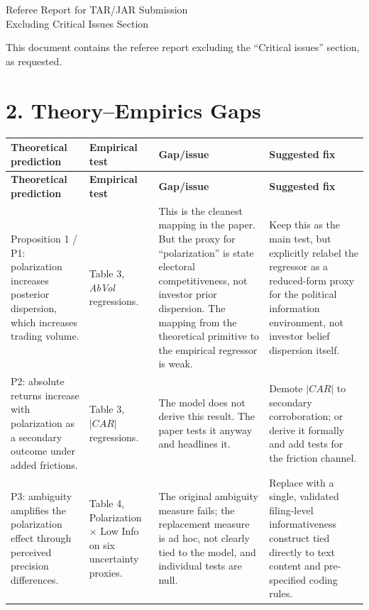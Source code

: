\documentclass[11pt]{article}
\begin{document}
\begin{center}
{\LARGE Referee Report for TAR/JAR Submission}\\[0.5em]
{\large Excluding Critical Issues Section}
\end{center}

This document contains the referee report excluding the ``Critical issues'' section, as requested.

\section*{2. Theory--Empirics Gaps}

\renewcommand{\arraystretch}{1.25}
\small
\begin{longtable}{>{\RaggedRight\arraybackslash}p{} >{\RaggedRight\arraybackslash}p{} >{\RaggedRight\arraybackslash}p{} >{\RaggedRight\arraybackslash}p{}}
\toprule
\textbf{Theoretical prediction} & \textbf{Empirical test} & \textbf{Gap/issue} & \textbf{Suggested fix} \\
\midrule
\endfirsthead
\toprule
\textbf{Theoretical prediction} & \textbf{Empirical test} & \textbf{Gap/issue} & \textbf{Suggested fix} \\
\midrule
\endhead

Proposition 1 / P1: polarization increases posterior dispersion, which increases trading volume. & Table 3, \textit{AbVol} regressions. & This is the cleanest mapping in the paper. But the proxy for ``polarization'' is state electoral competitiveness, not investor prior dispersion. The mapping from the theoretical primitive to the empirical regressor is weak. & Keep this as the main test, but explicitly relabel the regressor as a reduced-form proxy for the political information environment, not investor belief dispersion itself. \\

P2: absolute returns increase with polarization as a secondary outcome under added frictions. & Table 3, $|CAR|$ regressions. & The model does not derive this result. The paper tests it anyway and headlines it. & Demote $|CAR|$ to secondary corroboration; or derive it formally and add tests for the friction channel. \\

P3: ambiguity amplifies the polarization effect through perceived precision differences. & Table 4, Polarization $\times$ Low Info on six uncertainty proxies. & The original ambiguity measure fails; the replacement measure is ad hoc, not clearly tied to the model, and individual tests are null. & Replace with a single, validated filing-level informativeness construct tied directly to text content and pre-specified coding rules. \\


\end{longtable}
\end{document}
